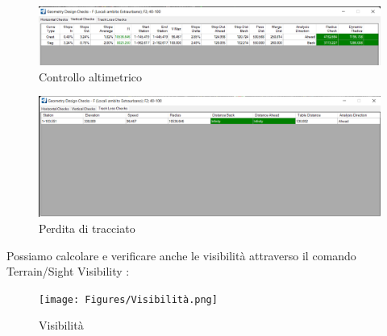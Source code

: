 \begin{figure}[H]
      \includegraphics[width=\textwidth]{Figures/Controllo altimetrico.png}
      \caption{Controllo altimetrico}
      \label{Controllo altimetrico}
  \end{figure}

  \begin{figure}[H]
    \centering
      \includegraphics[width=\textwidth]{Figures/Perdita di tracciato.png}
      \caption{Perdita di tracciato}
      \label{Perdita di tracciato}
    \end{figure}

    Possiamo calcolare e verificare anche le visibilità attraverso il comando Terrain/Sight Visibility :

    \begin{figure}[H]
      \texttt{[image: Figures/Visibilità.png]}
      \caption{Visibilità}
      \label{Visibilità}
  \end{figure}
